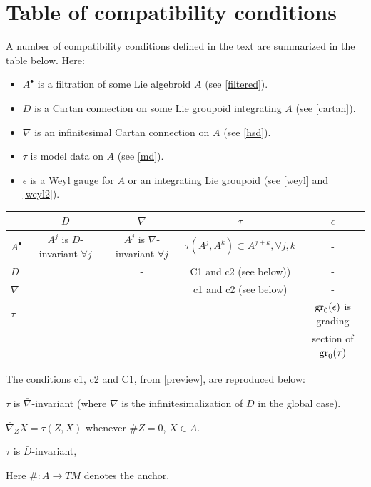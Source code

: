 \documentclass[leqno,12pt]{amsart} %
\begin{document}
\section{Table of compatibility conditions}
A number of compatibility conditions defined in the text are summarized in the table
below. Here:
\begin{itemize}
\item $A^\bullet$ is a filtration of some Lie algebroid $A$ (see \ref{filtered}).
  \item $D$ is a Cartan connection on some Lie groupoid
    integrating $A$ (see \ref{cartan}).
   \item $\nabla$ is an infinitesimal Cartan connection on
     $A$ (see \ref{hsd}).
   \item $\tau $ is model data on $A$ (see \ref{md}).
   \item $\epsilon$ is a Weyl gauge for $A$ or an integrating Lie groupoid (see \ref{weyl}
     and \ref{weyl2}).
\end{itemize}
\begin{table}[!ht]
  \centering
    \begin{tabular}{|l|c|c|c|c|}
    \hline
                   & $D$                         & $\nabla$                          & $\tau$  & $\epsilon$ \\ \hline
        $A^\bullet$ & $A^j$ is $\bar D$-invariant $\forall j$ & $A^j$ is $\bar\nabla$-invariant $\forall j$  & $\tau(A^j, A^k) \subset A^{j+k}, \forall j,k$ & - \\
        $D$        &                             & -                                 & C1 and c2 (see below)) & - \\
        $\nabla$   &                             &                                   & c1 and c2 (see below)  & - \\
        $\tau$     &                             &                                   &  & $\operatorname{\operatorname{gr}}_0(\epsilon)$ is grading \\
                   &                             &                                   &  & section of $\operatorname{\operatorname{gr}}_0(\tau)$ \\ \hline
    \end{tabular}
    \vspace{0.5\baselineskip}
\end{table}
\noindent%
The conditions c1, c2 and C1, from \ref{preview}, are reproduced below:
\begin{conditions}
  \item[{\bf c1.}] $\tau $ is $\bar\nabla$-invariant (where $\nabla $ is the infinitesimalization of $D$ in the global case).
  \item[{\bf c2.}] $\bar\nabla_ZX = \tau(Z, X)$ whenever $\#Z=0$, $X \in A$.
  \item[{\bf C1.}] $\tau $ is $\bar D$-invariant,
\end{conditions}
Here $\# \colon A \rightarrow TM $ denotes the anchor.
\end{document}
